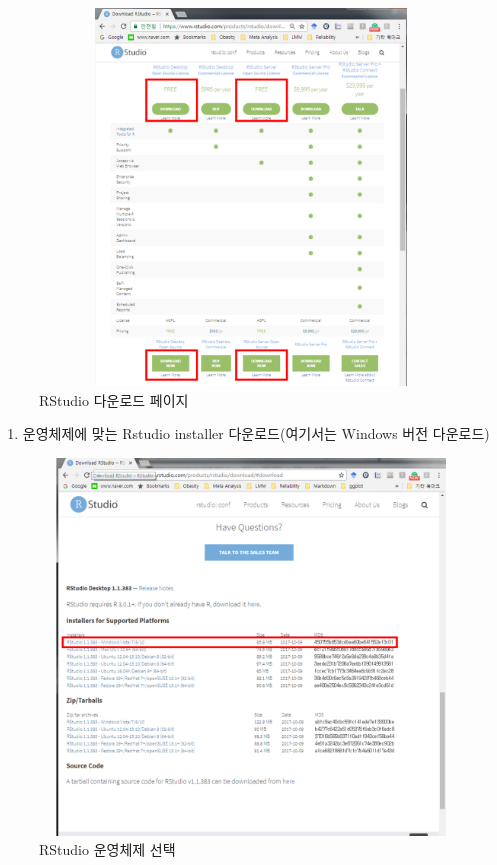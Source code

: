 \documentclass[11pt,a4paper]{book}
\providecommand{\tightlist}{%
  \setlength{\itemsep}{0pt}\setlength{\parskip}{0pt}}
\theoremstyle{definition}
\theoremstyle{definition}
\theoremstyle{definition}
\theoremstyle{remark}
\begin{document}
\begin{figure}[H]
{
  \centering
  \includegraphics[width = 12cm, height = 10cm]{Figures/Rstudio-download.png}
  \caption[RStudio 다운로드 페이지]{RStudio 다운로드 페이지}\label{fig:Rstudio-install-02}
}
\end{figure}

\begin{enumerate}
\def\labelenumi{\arabic{enumi}.}
\setcounter{enumi}{2}
\tightlist
\item
  운영체제에 맞는 Rstudio installer 다운로드(여기서는 Windows 버전
  다운로드)
\end{enumerate}

\begin{figure}[H]
{
  \centering
  \includegraphics[width = 12cm, height = 10cm]{Figures/Rstudio-download-02.png}
  \caption[RStudio 운영체제 선택]{RStudio 운영체제 선택}\label{fig:Rstudio-install-03}
}
\end{figure}
\end{document}
